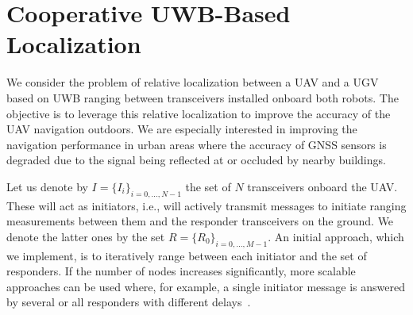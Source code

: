 


\section{Cooperative UWB-Based Localization}


We consider the problem of relative localization between a UAV and a UGV based on UWB ranging between transceivers installed onboard both robots. The objective is to leverage this relative localization to improve the accuracy of the UAV navigation outdoors. We are especially interested in improving the navigation performance in urban areas where the accuracy of GNSS sensors is degraded due to the signal being reflected at or occluded by nearby buildings.

Let us denote by $I = \{I_i\}_{i=0,\dots,N-1}$ the set of $N$ transceivers onboard the UAV. These will act as initiators, i.e., will actively transmit messages to initiate ranging measurements between them and the responder transceivers on the ground. We denote the latter ones by the set $R = \{R_0\}_{i=0,\dots,M-1}$. An initial approach, which we implement, is to iteratively range between each initiator and the set of responders. If the number of nodes increases significantly, more scalable approaches can be used where, for example, a single initiator message is answered by several or all responders with different delays~\cite{grobetawindhager2019snaploc}.

